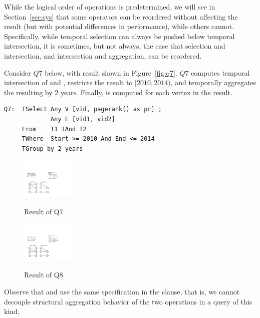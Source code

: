 While the logical order of operations is predetermined, we will see in
Section~\ref{sec:sys} that some operators can be reordered without
affecting the result (but with potential differences in performance),
while others cannot.  Specifically, while temporal selection can
always be pushed below temporal intersection, it is sometimes, but not
always, the case that selection and intersection, and intersection and
aggregation, can be reordered.

Consider $Q7$ below, with result shown in Figure~\ref{fig:q7}. $Q7$
computes temporal intersection of  and , restricts
the result to $[2010, 2014)$, and temporally aggregates the resulting
  \tg by 2 years.  Finally,  is computed for each
  vertex in the result.

\begin{small}
\begin{verbatim}
Q7:  TSelect Any V [vid, pagerank() as pr] ; 
             Any E [vid1, vid2] 
     From    T1 TAnd T2 
     TWhere  Start >= 2010 And End <= 2014 
     TGroup by 2 years
\end{verbatim}
\end{small}

\begin{figure}
\centering
\begin{minipage}{1.6in}
  \centering
  \includegraphics[width=1in]{figs/q7.pdf}
  \caption{Result of Q7.}{}
  \label{fig:q7}
\end{minipage}%
\begin{minipage}{1.6in}
  \centering
  \includegraphics[width=1in]{figs/q8.pdf}
  \caption{Result of Q8.}{}
  \label{fig:q8}
\end{minipage}
\end{figure}

Observe that  and  use the same
specification in the  clause, that is, we cannot
decouple structural aggregation behavior of the two operations in a
query of this kind.

